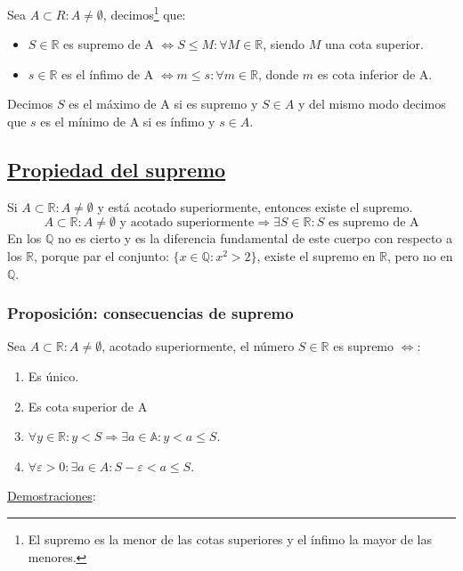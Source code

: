 \documentclass[10pt,a4paper,openright]{book}
\begin{document}
Sea $A\subset R: A\neq \emptyset$, decimos\footnote{El supremo es la menor de las cotas superiores y el ínfimo la mayor de las menores.} que:
\begin{itemize}
\item $S\in \mathbb R$ es supremo de A $\Leftrightarrow S\leq M: \forall M\in \mathbb R$, siendo $M$ una cota superior.

\item $s\in \mathbb R$ es el ínfimo de A $\Leftrightarrow m\leq s: \forall m\in \mathbb R$, donde $m$ es cota inferior de A.
\end{itemize}\par

Decimos $S$ es el máximo de A si es supremo y $S\in A$ y del mismo modo decimos que $s$ es el mínimo de A si es ínfimo y $s\in A$.

\subsection*{\underline{Propiedad del supremo}}
Si $A\subset \mathbb R: A\neq \emptyset$ y está acotado superiormente, entonces existe el supremo.
$$A\subset \mathbb R: A\neq \emptyset \mbox{ y acotado superiormente}\Rightarrow \exists S\in \mathbb R: S\mbox{ es supremo de A}$$
En los $\mathbb Q$ no es cierto y es la diferencia fundamental de este cuerpo con respecto a los $\mathbb R$, porque par el conjunto: $\{x\in \mathbb Q: x^2>2\}$, existe el supremo en $\mathbb R$, pero no en $\mathbb Q$.

\subsubsection*{Proposición: consecuencias de supremo}
Sea $A\subset \mathbb R: A\neq \emptyset$, acotado superiormente, el número $S\in \mathbb R$ es supremo $\Leftrightarrow$:
\begin{enumerate}
\item  Es único.
\item Es cota superior de A
\item $\forall y\in \mathbb R: y<S\Rightarrow \exists a\in \mathbb A: y<a\leq S$.
\item $\forall \varepsilon>0: \exists a\in A: S- \varepsilon <a\leq S$.
\end{enumerate}

\underline{Demostraciones}:
\end{document}
